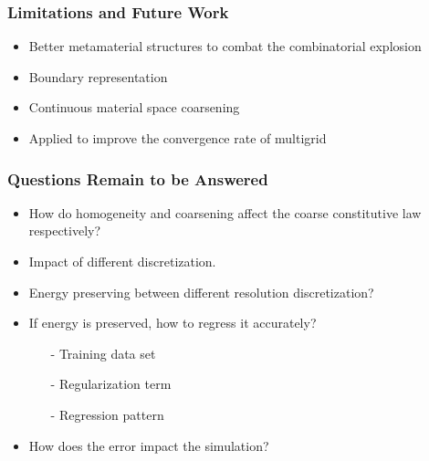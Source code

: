 \documentclass[serif,mathserif]{beamer}
\begin{document}
\begin{frame}
  \frametitle{Limitations and Future Work}
  \begin{itemize}
  \item Better metamaterial structures to combat the combinatorial explosion
  \item Boundary representation
  \item Continuous material space coarsening
  \item Applied to improve the convergence rate of multigrid
  \end{itemize}
\end{frame}

\begin{frame}
  \frametitle{Questions Remain to be Answered}
  \begin{itemize}
  \item How do homogeneity and coarsening affect the coarse constitutive law respectively?
    \pause
  \item Impact of different discretization.
    \pause
  \item Energy preserving between different resolution discretization?
    \pause
  \item If energy is preserved, how to regress it accurately?
    \begin{itemize}
    \item[-] Training data set
    \item[-] Regularization term
    \item[-] Regression pattern
    \end{itemize}
    \pause
  \item How does the error impact the simulation?
    \pause
  \end{itemize}
\end{frame}

\begin{frame} 
\end{frame}
\end{document}
